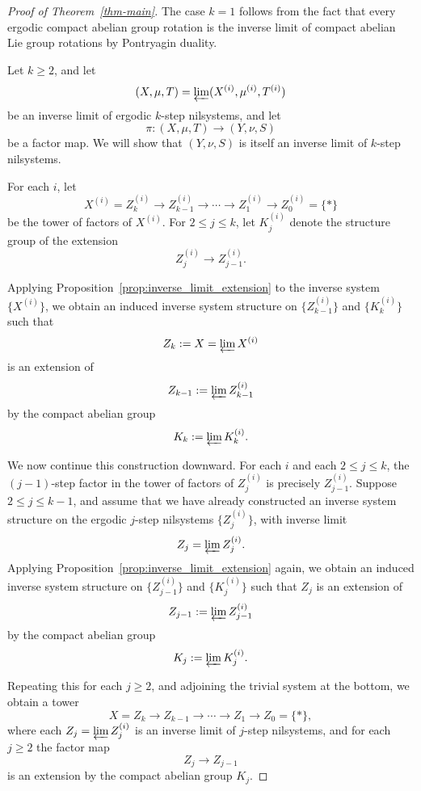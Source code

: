 \documentclass[12pt]{amsart}
\theoremstyle{plain}
\theoremstyle{definition}
\begin{document}
\begin{proof}[Proof of Theorem~\ref{thm-main}]
The case $k=1$ follows from the fact that every ergodic compact abelian group rotation is the inverse limit of compact abelian Lie group rotations by Pontryagin duality. 

    Let $k\geq 2$, and let 
    \[
    (X,\mu,T)=\varprojlim (X^{(i)},\mu^{(i)},T^{(i)})
    \]
    be an inverse limit of ergodic $k$-step nilsystems, and let
    \[
    \pi\colon (X,\mu,T)\to (Y,\nu,S)
    \]
    be a factor map.
    We will show that $(Y,\nu,S)$ is itself an inverse limit of $k$-step nilsystems.

    For each $i$, let
    \[
    X^{(i)} = Z_k^{(i)} \to Z_{k-1}^{(i)} \to \cdots \to Z_1^{(i)} \to Z_0^{(i)}=\{*\}
    \]
    be the tower of factors of $X^{(i)}$.
    For $2\leq j\leq k$, let $K_j^{(i)}$ denote the structure group of the extension
    \[
    Z_j^{(i)}\to Z_{j-1}^{(i)}.
    \]

    Applying Proposition~\ref{prop:inverse_limit_extension} to the inverse system $\{X^{(i)}\}$, we obtain an induced inverse system structure on $\{Z_{k-1}^{(i)}\}$ and $\{K_k^{(i)}\}$ such that
    \[
    Z_k:=X=\varprojlim X^{(i)}
    \]
    is an extension of
    \[
    Z_{k-1}:=\varprojlim Z_{k-1}^{(i)}
    \]
    by the compact abelian group
    \[
    K_k:=\varprojlim K_k^{(i)}.
    \]

    We now continue this construction downward.
    For each $i$ and each $2\leq j\leq k$, the $(j-1)$-step factor in the tower of factors of $Z_j^{(i)}$ is precisely $Z_{j-1}^{(i)}$.
    Suppose $2\leq j\leq k-1$, and assume that we have already constructed an inverse system structure on the ergodic $j$-step nilsystems $\{Z_j^{(i)}\}$, with inverse limit
    \[
    Z_j=\varprojlim Z_j^{(i)}.
    \]
    Applying Proposition~\ref{prop:inverse_limit_extension} again, we obtain an induced inverse system structure on $\{Z_{j-1}^{(i)}\}$ and $\{K_j^{(i)}\}$ such that $Z_j$ is an extension of
    \[
    Z_{j-1}:=\varprojlim Z_{j-1}^{(i)}
    \]
    by the compact abelian group
    \[
    K_j:=\varprojlim K_j^{(i)}.
    \]

    Repeating this for each $j\geq 2$, and adjoining the trivial system at the bottom, we obtain a tower
    \[
    X=Z_k\to Z_{k-1}\to \cdots \to Z_1\to Z_0=\{*\},
    \]
    where each $Z_j=\varprojlim Z_j^{(i)}$ is an inverse limit of $j$-step nilsystems, and for each $j\geq 2$ the factor map
    \[
    Z_j\to Z_{j-1}
    \]
    is an extension by the compact abelian group $K_j$.


\end{proof}
\end{document}

